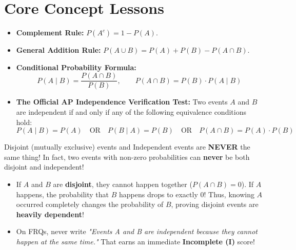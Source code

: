 \section{Core Concept Lessons}

\begin{lessonbox}
\begin{itemize}[leftmargin=1.2em]
  \item \textbf{Complement Rule:} $P(A^c) = 1 - P(A)$.
  \item \textbf{General Addition Rule:} $P(A \cup B) = P(A) + P(B) - P(A \cap B)$.
  \item \textbf{Conditional Probability Formula:}
  \begin{equation}
    P(A \mid B) = \frac{P(A \cap B)}{P(B)}, \qquad P(A \cap B) = P(B) \cdot P(A \mid B)
  \end{equation}
  \item \textbf{The Official AP Independence Verification Test:}
  Two events $A$ and $B$ are independent if and only if any of the following equivalence conditions hold:
  \begin{equation}
    P(A \mid B) = P(A) \quad \text{OR} \quad P(B \mid A) = P(B) \quad \text{OR} \quad P(A \cap B) = P(A) \cdot P(B)
  \end{equation}
\end{itemize}
\end{lessonbox}

\begin{trapbox}
Disjoint (mutually exclusive) events and Independent events are \textbf{NEVER} the same thing! In fact, two events with non-zero probabilities can \textbf{never} be both disjoint and independent!
\begin{itemize}[leftmargin=1.2em]
  \item If $A$ and $B$ are \textbf{disjoint}, they cannot happen together ($P(A \cap B) = 0$). If $A$ happens, the probability that $B$ happens drops to exactly 0! Thus, knowing $A$ occurred completely changes the probability of $B$, proving disjoint events are \textbf{heavily dependent}!
  \item On FRQs, never write \textit{"Events A and B are independent because they cannot happen at the same time."} That earns an immediate \textbf{Incomplete (I)} score!
\end{itemize}
\end{trapbox}

